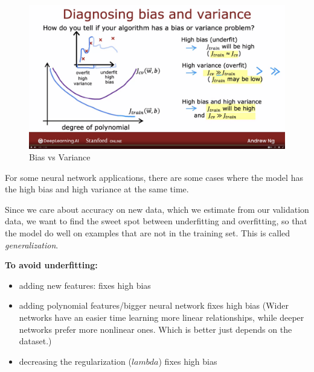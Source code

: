 \documentclass[12pt]{report}
\begin{document}
\begin{figure}[H]
  \centering
  \caption{Bias vs Variance}
  \includegraphics[trim =0.0cm 0.0cm 0.0cm 0.0cm, clip, scale=0.12]{pics/biasVariance.png}
\end{figure}

For some neural network applications, there are some cases where the model has the high bias and high variance at the same time.


Since we care about accuracy on new data, which we estimate from our validation data, we want to find the sweet spot between underfitting and overfitting, so that the model do well on examples that are not in the training set. This is called \textit{generalization}.

\textbf{To avoid underfitting:}
\begin{itemize}
\item adding new features: fixes high bias
\item adding polynomial features/bigger neural network fixes high bias (Wider networks have an easier time learning more linear relationships, while deeper networks prefer more nonlinear ones. Which is better just depends on the dataset.)
\item decreasing the regularization ($lambda$) fixes high bias
\end{itemize}
\end{document}
